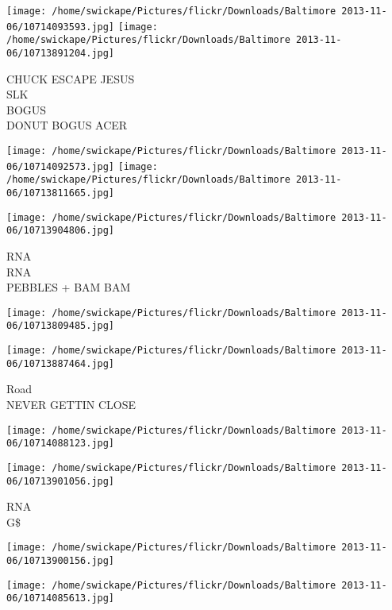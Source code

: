 \documentclass[10pt,letterpaper]{article}
\begin{document}
\texttt{[image: /home/swickape/Pictures/flickr/Downloads/Baltimore 2013-11-06/10714093593.jpg]}
\texttt{[image: /home/swickape/Pictures/flickr/Downloads/Baltimore 2013-11-06/10713891204.jpg]}

CHUCK ESCAPE JESUS\\
SLK\\
BOGUS\\
DONUT BOGUS ACER\\
\pagebreak

\texttt{[image: /home/swickape/Pictures/flickr/Downloads/Baltimore 2013-11-06/10714092573.jpg]}
\texttt{[image: /home/swickape/Pictures/flickr/Downloads/Baltimore 2013-11-06/10713811665.jpg]}

\vspace{0.25in}
\texttt{[image: /home/swickape/Pictures/flickr/Downloads/Baltimore 2013-11-06/10713904806.jpg]}

RNA\\
RNA\\
PEBBLES + BAM BAM\\
\pagebreak

\texttt{[image: /home/swickape/Pictures/flickr/Downloads/Baltimore 2013-11-06/10713809485.jpg]}

\vspace{0.25in}
\texttt{[image: /home/swickape/Pictures/flickr/Downloads/Baltimore 2013-11-06/10713887464.jpg]}

Road\\
NEVER GETTIN CLOSE\\
\pagebreak

\texttt{[image: /home/swickape/Pictures/flickr/Downloads/Baltimore 2013-11-06/10714088123.jpg]}

\vspace{0.25in}
\texttt{[image: /home/swickape/Pictures/flickr/Downloads/Baltimore 2013-11-06/10713901056.jpg]}

RNA\\
G\$\\
\pagebreak

\texttt{[image: /home/swickape/Pictures/flickr/Downloads/Baltimore 2013-11-06/10713900156.jpg]}

\vspace{0.25in}
\texttt{[image: /home/swickape/Pictures/flickr/Downloads/Baltimore 2013-11-06/10714085613.jpg]}
\end{document}
